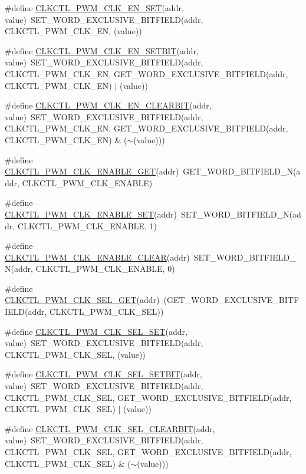 \begin{DoxyCompactItemize}
\item 
\#define \hyperlink{a00544_a55b0a07c2a27c1dab78589a09a54335f}{CLKCTL\_\-PWM\_\-CLK\_\-EN\_\-SET}(addr, value)~SET\_\-WORD\_\-EXCLUSIVE\_\-BITFIELD(addr, CLKCTL\_\-PWM\_\-CLK\_\-EN, (value))
\item 
\#define \hyperlink{a00544_a1d68a19dbb8869e2951368d517d66f24}{CLKCTL\_\-PWM\_\-CLK\_\-EN\_\-SETBIT}(addr, value)~SET\_\-WORD\_\-EXCLUSIVE\_\-BITFIELD(addr, CLKCTL\_\-PWM\_\-CLK\_\-EN, GET\_\-WORD\_\-EXCLUSIVE\_\-BITFIELD(addr, CLKCTL\_\-PWM\_\-CLK\_\-EN) $|$ (value))
\item 
\#define \hyperlink{a00544_a1b5d93be4e364dfbfbda9200f5a3c725}{CLKCTL\_\-PWM\_\-CLK\_\-EN\_\-CLEARBIT}(addr, value)~SET\_\-WORD\_\-EXCLUSIVE\_\-BITFIELD(addr, CLKCTL\_\-PWM\_\-CLK\_\-EN, GET\_\-WORD\_\-EXCLUSIVE\_\-BITFIELD(addr, CLKCTL\_\-PWM\_\-CLK\_\-EN) \& ($\sim$(value)))
\item 
\#define \hyperlink{a00544_adaf16951ca9ad148d36a7ff6a06b7825}{CLKCTL\_\-PWM\_\-CLK\_\-ENABLE\_\-GET}(addr)~GET\_\-WORD\_\-BITFIELD\_\-N(addr, CLKCTL\_\-PWM\_\-CLK\_\-ENABLE)
\item 
\#define \hyperlink{a00544_a996d679f373215c4e0de349305b58ee9}{CLKCTL\_\-PWM\_\-CLK\_\-ENABLE\_\-SET}(addr)~SET\_\-WORD\_\-BITFIELD\_\-N(addr, CLKCTL\_\-PWM\_\-CLK\_\-ENABLE, 1)
\item 
\#define \hyperlink{a00544_aea2bb5b61094a804d0b83cbc02a0f06c}{CLKCTL\_\-PWM\_\-CLK\_\-ENABLE\_\-CLEAR}(addr)~SET\_\-WORD\_\-BITFIELD\_\-N(addr, CLKCTL\_\-PWM\_\-CLK\_\-ENABLE, 0)
\item 
\#define \hyperlink{a00544_ae1295da3d7425347b10ba72bb2dc1b04}{CLKCTL\_\-PWM\_\-CLK\_\-SEL\_\-GET}(addr)~(GET\_\-WORD\_\-EXCLUSIVE\_\-BITFIELD(addr, CLKCTL\_\-PWM\_\-CLK\_\-SEL))
\item 
\#define \hyperlink{a00544_a9c092d77465188af601000485a71150e}{CLKCTL\_\-PWM\_\-CLK\_\-SEL\_\-SET}(addr, value)~SET\_\-WORD\_\-EXCLUSIVE\_\-BITFIELD(addr, CLKCTL\_\-PWM\_\-CLK\_\-SEL, (value))
\item 
\#define \hyperlink{a00544_a2a56eaa6d2160d40b40bd60e1576bd62}{CLKCTL\_\-PWM\_\-CLK\_\-SEL\_\-SETBIT}(addr, value)~SET\_\-WORD\_\-EXCLUSIVE\_\-BITFIELD(addr, CLKCTL\_\-PWM\_\-CLK\_\-SEL, GET\_\-WORD\_\-EXCLUSIVE\_\-BITFIELD(addr, CLKCTL\_\-PWM\_\-CLK\_\-SEL) $|$ (value))
\item 
\#define \hyperlink{a00544_a5192daad1a0aad5686942eeb43f0d0a8}{CLKCTL\_\-PWM\_\-CLK\_\-SEL\_\-CLEARBIT}(addr, value)~SET\_\-WORD\_\-EXCLUSIVE\_\-BITFIELD(addr, CLKCTL\_\-PWM\_\-CLK\_\-SEL, GET\_\-WORD\_\-EXCLUSIVE\_\-BITFIELD(addr, CLKCTL\_\-PWM\_\-CLK\_\-SEL) \& ($\sim$(value)))

\end{DoxyCompactItemize}
